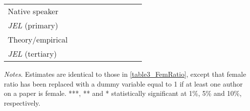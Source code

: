 \begin{table}[H]
\begin{threeparttable}
\begin{tabular}{p{2cm}S@{}S@{}S@{}S@{}S@{}S@{}S@{}S@{}S@{}}
            Native speaker                &               &               &               &               &           {}   &           {}   &           {}   &           {}   &           {}   \\
            \textit{JEL} (primary)        &               &               &               &               &               &               &           {}   &               &               \\
            Theory/empirical              &               &               &               &               &               &               &               &           {}   &               \\
            \textit{JEL} (tertiary)       &               &               &               &               &               &               &               &               &           {}   \\
            \bottomrule
        \end{tabular}
        \begin{tablenotes}
            \tiny
            \item \textit{Notes}. Estimates are identical to those in \autoref{table3_FemRatio}, except that female ratio has been replaced with a dummy variable equal to 1 if at least one author on a paper is female. ***, ** and * statistically significant at 1\%, 5\% and 10\%, respectively.
        \end{tablenotes}
    \end{threeparttable}
\end{table}